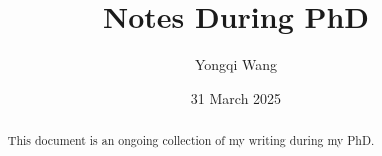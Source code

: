 \documentclass[aos]{imsart}
\title{Notes During PhD}
\author{Yongqi Wang}
\date{31 March 2025} %
\numberwithin{equation}{section}
\begin{document}
\maketitle

\tableofcontents

\begin{abstract}
    \noindent
    This document is an ongoing collection of my writing during my PhD.
\end{abstract}







\clearpage

\nocite{*}



\end{document}
